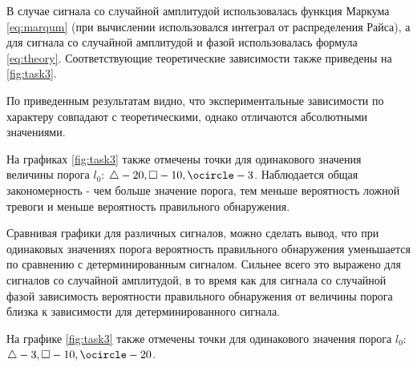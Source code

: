 В случае сигнала со случайной амплитудой использовалась функция Маркума \eqref{eq:marqum} 
(при вычислении использовался интеграл от распределения Райса), а для сигнала со случайной амплитудой и фазой
использовалась формула \eqref{eq:theory}. Соответствующие теоретические зависимости также приведены на \ref{fig:task3}.

По приведенным результатам видно, что экспериментальные зависимости по характеру совпадают с теоретическими,
однако отличаются абсолютными значениями.

На графиках \ref{fig:task3} также отмечены точки для одинакового значения величины порога $l_0$: $\triangle - 20, \square - 10, \ocircle - 3$.
Наблюдается общая закономерность - чем больше значение порога, тем меньше вероятность
ложной тревоги и меньше вероятность правильного обнаружения.

Сравнивая графики для 
различных сигналов, можно сделать вывод, что при одинаковых значениях порога вероятность правильного
обнаружения уменьшается по сравнению с детерминированным сигналом.
Сильнее всего это выражено для сигналов со случайной амплитудой, в то время как для сигнала
со случайной фазой зависимость вероятности правильного обнаружения от величины порога близка
к зависимости для детерминированного сигнала.

На графике \ref{fig:task3} также отмечены точки для одинакового значения порога $l_0$: $\triangle - 3, \square - 10, \ocircle - 20$.

